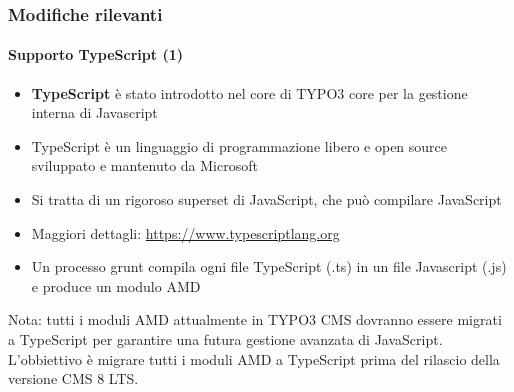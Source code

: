 \begin{frame}[fragile]
	\frametitle{Modifiche rilevanti}
	\framesubtitle{Supporto TypeScript (1)}

	\begin{itemize}
		\item \textbf{TypeScript} è stato introdotto nel core di TYPO3 core per la gestione interna di Javascript
		\item TypeScript è un linguaggio di programmazione libero e open source sviluppato e mantenuto da Microsoft
		\item Si tratta di un rigoroso superset di JavaScript, che può compilare JavaScript
		\item Maggiori dettagli: \url{https://www.typescriptlang.org}
		\item Un processo grunt compila ogni file TypeScript (.ts) in un file Javascript (.js) e produce un modulo AMD
	\end{itemize}

	\small
		Nota: tutti i moduli AMD attualmente in TYPO3 CMS dovranno essere migrati a TypeScript per garantire una futura gestione avanzata di JavaScript.
		L'obbiettivo è migrare tutti i moduli AMD a TypeScript prima del rilascio della versione CMS 8 LTS.
	\normalsize

\end{frame}


